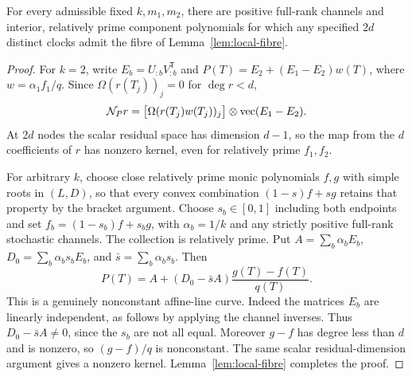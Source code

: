 \begin{proposition}\label{prop:clocks}
For every admissible fixed $k,m_1,m_2$, there are positive full-rank
channels and interior, relatively prime component polynomials for
which any specified $2d$ distinct clocks admit the fibre of
Lemma~\ref{lem:local-fibre}.
\end{proposition}
\begin{proof}
For $k=2$, write $E_b=U_{:b}V_{:b}^{\mathsf T}$ and
$P(T)=E_2+(E_1-E_2)w(T)$, where $w=\alpha_1f_1/q$.
Since $\Omega(r(T_j))_j=0$ for $\deg r<d$,
\[
 \mathcal N_Pr=\big[\Omega(r(T_j)w(T_j))_j\big]
                   \otimes\operatorname{vec}(E_1-E_2).
\]
At $2d$ nodes the scalar residual space has dimension $d-1$, so the
map from the $d$ coefficients of $r$ has nonzero kernel, even for
relatively prime $f_1,f_2$.

For arbitrary $k$, choose close relatively prime monic polynomials
$f,g$ with simple roots in $(L,D)$, so that every convex combination
$(1-s)f+sg$ retains that property by the bracket argument. Choose
$s_b\in[0,1]$ including both endpoints and set
$f_b=(1-s_b)f+s_bg$, with $\alpha_b=1/k$ and any strictly positive
full-rank stochastic channels. The collection is relatively prime.
Put $A=\sum_b\alpha_bE_b$, $D_0=\sum_b\alpha_bs_bE_b$, and
$\bar s=\sum_b\alpha_bs_b$. Then
\[
 P(T)=A+(D_0-\bar sA)\frac{g(T)-f(T)}{q(T)}.
\]
This is a genuinely nonconstant affine-line curve. Indeed the matrices
$E_b$ are linearly independent, as follows by applying the channel
inverses. Thus $D_0-\bar sA\ne0$, since the $s_b$ are not all equal.
Moreover $g-f$ has degree less than $d$ and is nonzero, so $(g-f)/q$
is nonconstant. The same scalar residual-dimension argument gives a
nonzero kernel. Lemma~\ref{lem:local-fibre} completes the proof.
\end{proof}


